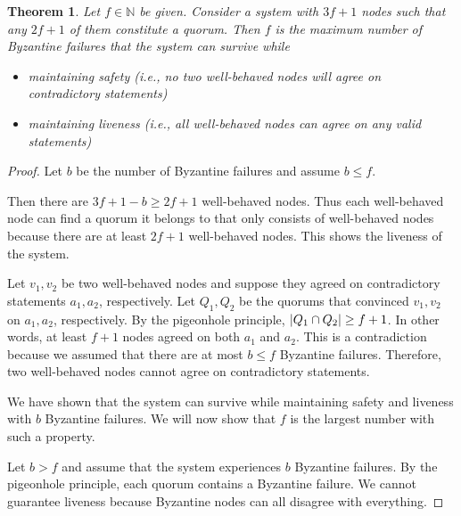 \documentclass[12pt, psamsfonts]{amsart}
\newtheorem{thm}{Theorem}[section]
\theoremstyle{definition}
\theoremstyle{remark}
\numberwithin{equation}{section}
\begin{document}
\begin{thm}
    Let $f \in \mathbb{N}$ be given.
    Consider a system with $3f + 1$ nodes such that any $2f + 1$ of them constitute a quorum.
    Then $f$ is the maximum number of Byzantine failures that the system can survive while
    \begin{itemize}
        \item
            maintaining safety (i.e., no two well-behaved nodes will agree on contradictory statements)
        \item
            maintaining liveness (i.e., all well-behaved nodes can agree on any valid statements)
    \end{itemize}
\end{thm}

\begin{proof}
    Let $b$ be the number of Byzantine failures and assume $b \leq f$.

    Then there are $3f + 1 - b \geq 2f + 1$ well-behaved nodes.
    Thus each well-behaved node can find a quorum it belongs to that only consists of well-behaved nodes because there are at least $2f + 1$ well-behaved nodes.
    This shows the liveness of the system.

    Let $v_1, v_2$ be two well-behaved nodes and suppose they agreed on contradictory statements $a_1, a_2$, respectively.
    Let $Q_1, Q_2$ be the quorums that convinced $v_1, v_2$ on $a_1, a_2$, respectively.
    By the pigeonhole principle, $\abs{Q_1 \cap Q_2} \geq f + 1$.
    In other words, at least $f + 1$ nodes agreed on both $a_1$ and $a_2$.
    This is a contradiction because we assumed that there are at most $b \leq f$ Byzantine failures.
    Therefore, two well-behaved nodes cannot agree on contradictory statements.

    We have shown that the system can survive while maintaining safety and liveness with $b$ Byzantine failures.
    We will now show that $f$ is the largest number with such a property.

    Let $b > f$ and assume that the system experiences $b$ Byzantine failures.
    By the pigeonhole principle, each quorum contains a Byzantine failure.
    We cannot guarantee liveness because Byzantine nodes can all disagree with everything. 
\end{proof}
\end{document}
